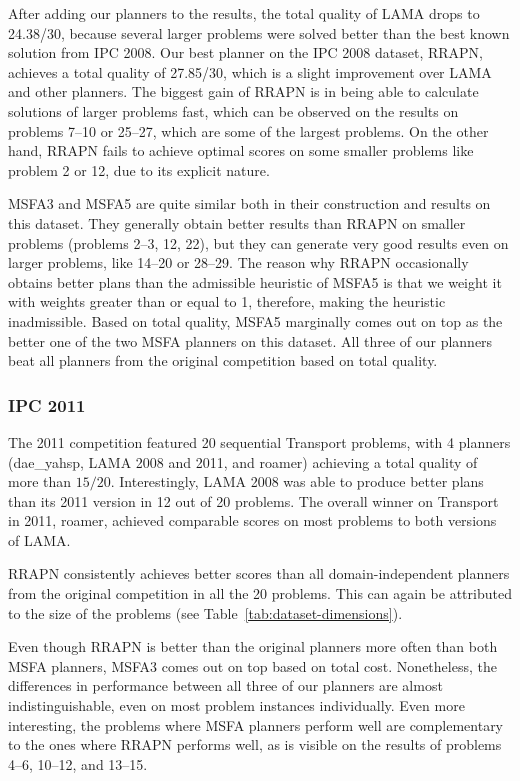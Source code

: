 After adding our planners to the results,
the total quality of LAMA drops to 24.38/30,
because several larger problems were solved better than the
best known solution from IPC 2008.
Our best planner on the IPC 2008 dataset, RRAPN, achieves a total quality of 27.85/30,
which is a slight improvement over LAMA and other planners. The biggest gain of RRAPN is in being able to calculate
solutions of larger problems fast, which can be observed on
the results on problems 7--10 or 25--27,
which are some of the largest problems.
On the other hand, RRAPN fails to achieve optimal scores
on some smaller problems like problem 2 or 12,
due to its explicit nature.

MSFA3 and MSFA5 are quite similar both in their construction and results on this dataset.
They generally obtain better results than RRAPN on smaller problems
(problems 2--3, 12, 22),
but they can generate very good results even on larger problems,
like 14--20 or 28--29.
The reason why RRAPN occasionally obtains better plans than the
admissible heuristic of MSFA5 is that we weight it
with weights greater than or equal to 1,
therefore, making the heuristic inadmissible.
Based on total quality, MSFA5 marginally comes out on top as the better one of the two MSFA planners on this dataset.
All three of our planners beat all planners from the original competition based on total quality.

\subsubsection{IPC 2011}

The 2011 competition featured 20 sequential Transport problems,
with 4 planners (dae\_yahsp, LAMA 2008 and 2011, and roamer) achieving a total quality of more than $15/20$.
Interestingly, LAMA 2008 was able to produce better plans than its 2011 version in 12 out of 20 problems. The overall winner on Transport in 2011, roamer, achieved comparable scores on most problems to both versions of LAMA.

RRAPN consistently achieves better scores than all domain-independent planners from the original competition in all the 20 problems. This can again be attributed to the size
of the problems (see Table~\ref{tab:dataset-dimensions}).

Even though RRAPN is better than the original planners more often than both MSFA planners,
MSFA3 comes out on top based on total cost.
Nonetheless, the differences in performance between all three of our planners
are almost indistinguishable, even on most problem instances individually.
Even more interesting, the problems
where MSFA planners perform well are complementary to the ones where RRAPN performs well,
as is visible on the results of problems 4--6, 10--12, and 13--15.

